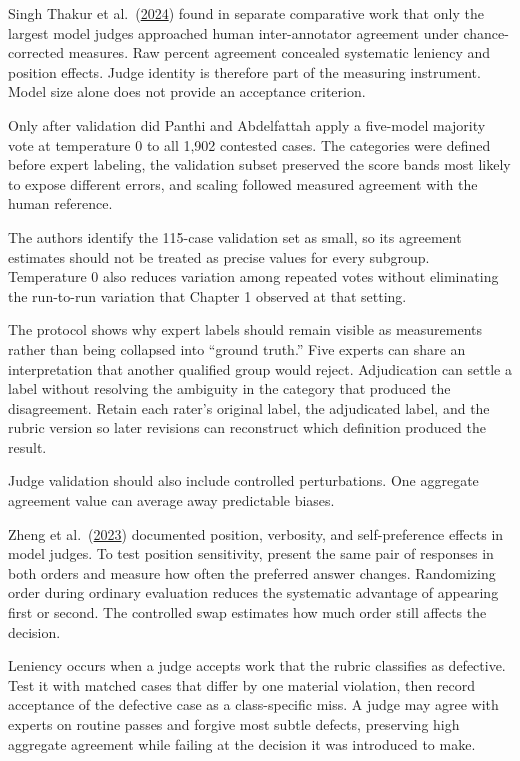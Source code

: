 Singh Thakur et al.~(\href{https://arxiv.org/abs/2406.12624}{2024}) found in separate comparative work that only the largest model judges approached human inter-annotator agreement under chance-corrected measures. Raw percent agreement concealed systematic leniency and position effects. Judge identity is therefore part of the measuring instrument. Model size alone does not provide an acceptance criterion.

Only after validation did Panthi and Abdelfattah apply a five-model majority vote at temperature 0 to all 1,902 contested cases. The categories were defined before expert labeling, the validation subset preserved the score bands most likely to expose different errors, and scaling followed measured agreement with the human reference.

The authors identify the 115-case validation set as small, so its agreement estimates should not be treated as precise values for every subgroup. Temperature 0 also reduces variation among repeated votes without eliminating the run-to-run variation that Chapter 1 observed at that setting.

The protocol shows why expert labels should remain visible as measurements rather than being collapsed into ``ground truth.'' Five experts can share an interpretation that another qualified group would reject. Adjudication can settle a label without resolving the ambiguity in the category that produced the disagreement. Retain each rater's original label, the adjudicated label, and the rubric version so later revisions can reconstruct which definition produced the result.

Judge validation should also include controlled perturbations. One aggregate agreement value can average away predictable biases.

Zheng et al.~(\href{https://arxiv.org/abs/2306.05685}{2023}) documented position, verbosity, and self-preference effects in model judges. To test position sensitivity, present the same pair of responses in both orders and measure how often the preferred answer changes. Randomizing order during ordinary evaluation reduces the systematic advantage of appearing first or second. The controlled swap estimates how much order still affects the decision.

Leniency occurs when a judge accepts work that the rubric classifies as defective. Test it with matched cases that differ by one material violation, then record acceptance of the defective case as a class-specific miss. A judge may agree with experts on routine passes and forgive most subtle defects, preserving high aggregate agreement while failing at the decision it was introduced to make.

